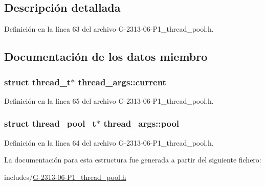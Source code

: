 \subsection{Descripción detallada}


Definición en la línea 63 del archivo G-\/2313-\/06-\/\+P1\+\_\+thread\+\_\+pool.\+h.



\subsection{Documentación de los datos miembro}
\hypertarget{structthread__args_a191f3ea514283452d04bde31cde4c7ad}{}
\subsubsection[{current}]{\setlength{\rightskip}{0pt plus 5cm}struct {\bf thread\+\_\+t}$\ast$ thread\+\_\+args\+::current}\label{structthread__args_a191f3ea514283452d04bde31cde4c7ad}


Definición en la línea 65 del archivo G-\/2313-\/06-\/\+P1\+\_\+thread\+\_\+pool.\+h.

\hypertarget{structthread__args_a425ced5f77dcbb52f61d240a4e207a27}{}
\subsubsection[{pool}]{\setlength{\rightskip}{0pt plus 5cm}struct {\bf thread\+\_\+pool\+\_\+t}$\ast$ thread\+\_\+args\+::pool}\label{structthread__args_a425ced5f77dcbb52f61d240a4e207a27}


Definición en la línea 64 del archivo G-\/2313-\/06-\/\+P1\+\_\+thread\+\_\+pool.\+h.



La documentación para esta estructura fue generada a partir del siguiente fichero\+:\begin{DoxyCompactItemize}
\item 
includes/\hyperlink{G-2313-06-P1__thread__pool_8h}{G-\/2313-\/06-\/\+P1\+\_\+thread\+\_\+pool.\+h}\end{DoxyCompactItemize}
